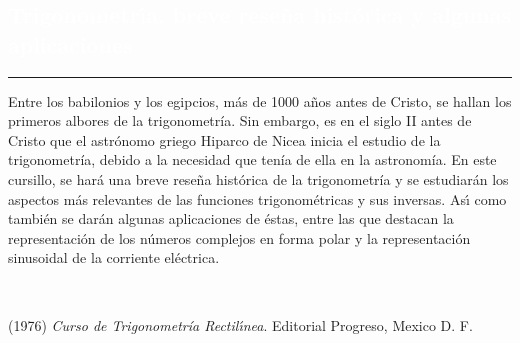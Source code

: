 \begin{titlepage}
\pagecolor{white}
\BgThispage
{}
\vspace*{-1.1cm}
\noindent
\def\titulo#1{\section{#1}}
\section{\bf\large\textcolor{white}{Trigonometr\'{\i}a, breve rese\~{n}a hist\'{o}rica y algunas aplicaciones}}
\vspace*{2cm}\par
\noindent

\begin{minipage}{0.5\linewidth}
\begin{minipage}{0.45\linewidth}
    \begin{flushright}
        \printauthor
    \end{flushright}
\end{minipage} \hspace{0pt}
%
\begin{minipage}{0.02\linewidth}
      \color{ptctitle} \rule{1pt}{175pt}
\end{minipage} 
\end{minipage}
\hspace*{-4.5cm}
%
\begin{minipage}{0.85\linewidth}
\begin{minipage}{0.85\linewidth}
\footnotesize
\vspace{5pt}
    \begin{resumen}     
Entre los babilonios y los egipcios, m\'{a}s de 1000 a\~nos antes de Cristo, se hallan los primeros albores de la trigonometr\'{i}a. Sin embargo, es en el siglo II antes de Cristo que el astr\'{o}nomo griego Hiparco de Nicea inicia el estudio de la trigonometr\'{i}a, debido a la necesidad que ten\'{i}a de ella en la astronom\'{i}a.  En este cursillo, se har\'{a} una breve rese\~{n}a hist\'{o}rica de la trigonometr\'{i}a y se estudiar\'{a}n los aspectos m\'{a}s relevantes de las funciones trigonom\'{e}tricas y sus inversas. As\'{\i} como tambi\'{e}n se dar\'{a}n algunas aplicaciones de \'{e}stas, entre las que destacan la representaci\'{o}n de los n\'{u}meros complejos en forma polar y la representaci\'{o}n sinusoidal de la corriente el\'{e}ctrica.
    \end{resumen}
   \end{minipage}
   \vspace{10pt}
\end{minipage}
\vspace{10pt}\\[5pt]
\begin{thebibliography}{99}
 (1976) {\it Curso de Trigonometr\'{i}a Rectil\'{\i}nea}.  Editorial Progreso, Mexico D. F.


\end{thebibliography}
\end{titlepage}
